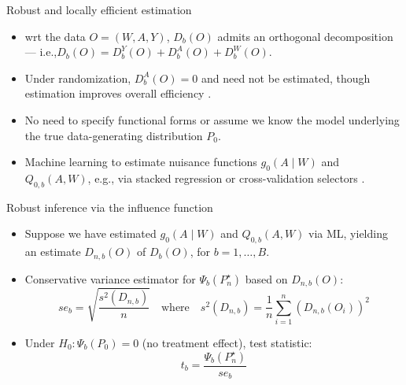 \documentclass{beamer}
\begin{document}

\begin{frame}[c]{Robust and locally efficient estimation}

\begin{center}
\begin{itemize}
  \itemsep12pt
  \item wrt the data $O = (W,A,Y)$, $D_b(O)$ admits an orthogonal decomposition
    --- i.e.,$D_b(O) = D_b^Y(O) + D_b^A(O) + D_b^W(O)$.
  \item Under randomization, $D_b^A(O) = 0$ and need not be estimated, though
    estimation improves overall efficiency \citep{tsiatis2007semiparametric}.
  \item No need to specify functional forms or assume we know the model
    underlying the true data-generating distribution $P_0$.
  \item Machine learning to estimate nuisance functions $g_0(A \mid W)$ and
    $Q_{0,b}(A,W)$, e.g., via stacked regression or cross-validation selectors
    \citep{breiman1996stacked, vdl2007super}.
\end{itemize}
\end{center}

\end{frame}


\begin{frame}[c]{Robust inference via the influence function}

\begin{center}
\begin{itemize}
  \itemsep12pt
  \item Suppose we have estimated $g_0(A \mid W)$ and $Q_{0,b}(A,W)$ via ML,
    yielding an estimate $D_{n,b}(O)$ of $D_b(O)$, for $b = 1, \ldots, B$.
  \item Conservative variance estimator for $\Psi_b(P_n^{\star})$ based on
    $D_{n,b}(O)$:
    \begin{equation*}
      se_b = \sqrt{\frac{s^2(D_{n,b})}{n}} \quad \text{where} \quad
      s^2(D_{n,b}) = \frac{1}{n}\sum_{i=1}^n\left(D_{n,b}(O_i) \right)^2
    \end{equation*}
  \item Under $H_0: \Psi_b(P_0) = 0$ (no treatment effect), test statistic:
    \begin{equation*}
      t_b = \frac{\Psi_b(P_n^{\star})}{se_b}
    \end{equation*}
\end{itemize}
\end{center}

\end{frame}
\end{document}
